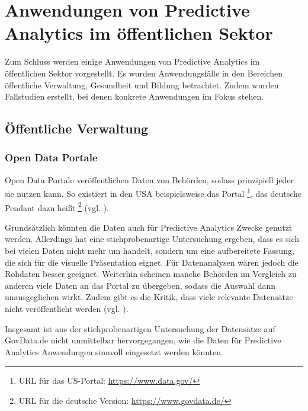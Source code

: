\chapter{Anwendungen von Predictive Analytics im öffentlichen Sektor}

Zum Schluss werden einige Anwendungen von Predictive Analytics im öffentlichen
Sektor vorgestellt. Es wurden Anwendungsfälle in den Bereichen öffentliche Verwaltung,
Gesundheit und Bildung betrachtet. Zudem wurden Fallstudien erstellt, bei denen
konkrete Anwendungen im Fokus stehen.


\section{Öffentliche Verwaltung}


\subsection{Open Data Portale}

Open Data Portale veröffentlichen Daten von Behörden, sodass prinzipiell jeder
sie nutzen kann. So existiert in den USA beispielsweise das Portal \grqq{}\footnote{
URL für das US-Portal: \url{https://www.data.gov/}
}, das deutsche Pendant dazu heißt \grqq{}\footnote{
URL für die deutsche Version: \url{https://www.govdata.de/} 
} (vgl. \cite{Borchers}). 

Grundsätzlich könnten die Daten auch für Predictive Analytics Zwecke genutzt werden.
Allerdings hat eine stichprobenartige Untersuchung ergeben, dass es sich bei vielen Daten
nicht mehr um \grqq{} handelt, sondern um eine aufbereitete Fassung, die sich
für die visuelle Präsentation eignet. Für Datenanalysen wären jedoch die Rohdaten besser geeignet.
Weiterhin scheinen manche Behörden im Vergleich zu anderen viele Daten an das Portal zu übergeben,
sodass die Auswahl dann unausgeglichen wirkt. Zudem gibt es die Kritik, dass viele relevante
Datensätze nicht veröffentlicht werden (vgl. \cite{Krempl}).


Insgesamt ist aus der stichprobenartigen Untersuchung der Datensätze auf GovData.de nicht unmittelbar
hervorgegangen, wie die Daten für Predictive Analytics Anwendungen sinnvoll eingesetzt werden könnten. 

